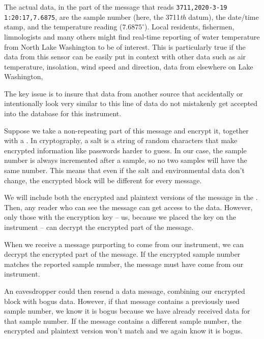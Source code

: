 The actual data, in the part of the message that reads \lstinline{3711,2020-3-19 1:20:17,7.6875}, are the sample number (here, the 3711\textit{th} datum), the date/time stamp, and the temperature reading ($7.6875^\circ$).
Local residents, fishermen, limnologists and many others might find real-time reporting of water temperature from North Lake Washington to be of interest.
This is particularly true if the data from this sensor can be easily put in context with other data such as air temperature, insolation, wind speed and direction, data from elsewhere on Lake Washington, \etc

The key issue is to insure that data from another source that accidentally or intentionally look very similar to this line of data do not mistakenly get accepted into the database for this instrument.

Suppose we take a non-repeating part of this message and encrypt it, together with a .
In cryptography, a salt is a string of random characters that make encrypted information like passwords harder to guess.
In our case, the sample number is always incremented after a sample, so no two samples will have the same number.
This means that even if the salt and environmental data don't change, the encrypted block will be different for every message.

We will include both the encrypted and plaintext versions of the message in the .
Then, any reader who can see the message can get access to the data.
However, only those with the encryption key -- us, because we placed the key on the instrument -- can decrypt the encrypted part of the message.

When we receive a message purporting to come from our instrument, we can decrypt the encrypted part of the message.
If the encrypted sample number matches the reported sample number, the message must have come from our instrument.

An eavesdropper could then resend a data message, combining our encrypted block with bogus data.
However, if that message contains a previously used sample number, we know it is bogus because we have already received data for that sample number. 
If the message contains a different sample number, the encrypted and plaintext version won't match and we again know it is bogus.


